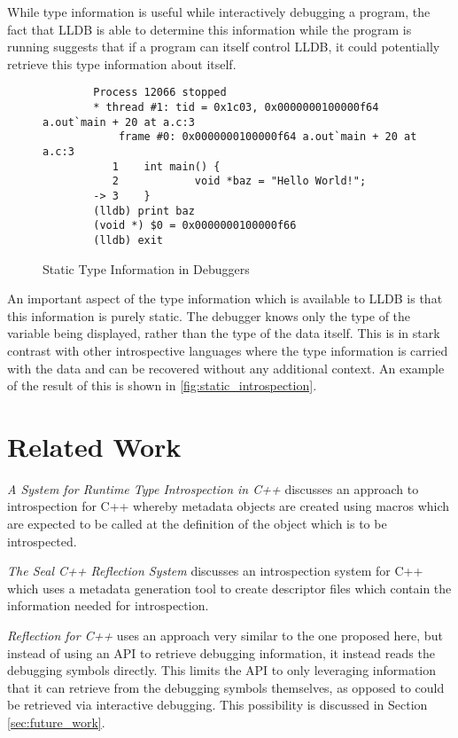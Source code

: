 \documentclass[twocolumn,draft]{article}
\begin{document}
While type information is useful while interactively debugging a program, the
fact that LLDB is able to determine this information while the program is
running suggests that if a program can itself control LLDB, it could potentially
retrieve this type information about itself.

\begin{figure*}[p]
	\begin{verbatim}
		Process 12066 stopped
		* thread #1: tid = 0x1c03, 0x0000000100000f64 a.out`main + 20 at a.c:3
		    frame #0: 0x0000000100000f64 a.out`main + 20 at a.c:3
		   1    int main() {
		   2            void *baz = "Hello World!";
		-> 3    }
		(lldb) print baz
		(void *) $0 = 0x0000000100000f66
		(lldb) exit
	\end{verbatim}
	\caption{Static Type Information in Debuggers}
	\label{fig:static_introspection}
\end{figure*}

An important aspect of the type information which is available to LLDB is that
this information is purely static. The debugger knows only the type of the
variable being displayed, rather than the type of the data itself. This is in
stark contrast with other introspective languages where the type information is
carried with the data and can be recovered without any additional context. An
example of the result of this is shown in \vref{fig:static_introspection}.

\section{Related Work}
\emph{A System for Runtime Type Introspection in C++}
\cite{deBayser:2012:SRT:2415308.2415317} discusses an approach to introspection
for C++ whereby metadata objects are created using macros which are expected to
be called at the definition of the object which is to be introspected.

\emph{The Seal C++ Reflection System} \cite{seal-cpp} discusses an introspection
system for C++ which uses a metadata generation tool to create descriptor files
which contain the information needed for introspection.

\emph{Reflection for C++} \cite{reflection-for-cpp} uses an approach very
similar to the one proposed here, but instead of using an API to retrieve
debugging information, it instead reads the debugging symbols directly. This
limits the API to only leveraging information that it can retrieve from the
debugging symbols themselves, as opposed to could be retrieved via interactive
debugging. This possibility is discussed in Section \ref{sec:future_work}.
\end{document}
